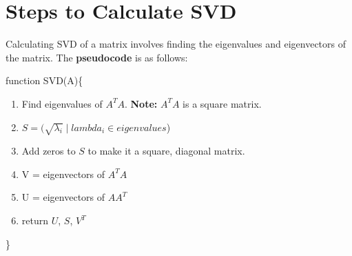 \section{Steps to Calculate SVD}

	Calculating SVD of a matrix involves finding the eigenvalues and eigenvectors of the matrix. The \textbf{pseudocode} is as follows:

\vspace{5mm}

\noindent function SVD(A)\{
	\vspace{-3mm}
	\begin{enumerate}
		\item Find eigenvalues of $A^TA$. \textbf{Note:} $A^TA$ is a square matrix.
		\item $S = (\sqrt{\lambda_i}\;|\;lambda_i \in eigenvalues$)
		\item Add zeros to $S$ to make it a square, diagonal matrix.
		\item V = eigenvectors of $A^TA$
		\item U = eigenvectors of $AA^T$
		\item return $U$, $S$, $V^T$
	\end{enumerate}

	\vspace{-3mm}
\noindent \}
